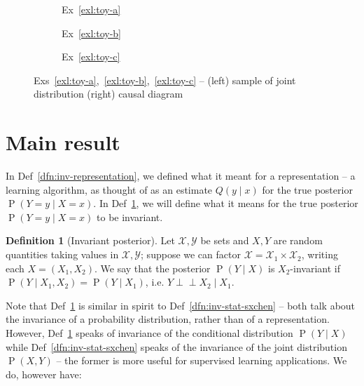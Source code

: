 \documentclass[12pt]{article}
\newcommand{\ci}{\perp\!\!\!\perp}
\newcommand{\Prob}[1]{\operatorname{P}\left(#1\right)}
\theoremstyle{definition}
\newtheorem{dfn}[thm]{Definition}
\numberwithin{equation}{section}
\numberwithin{figure}{section}
\numberwithin{table}{section}
\begin{document}
\begin{figure}

\begin{subfigure}{\textwidth}
    \centering
    
    \caption{Ex~\ref{exl:toy-a}}
    \label{fig:toy-a}
\end{subfigure}

\bigskip

\begin{subfigure}{\textwidth}
    \centering
    
    \caption{Ex~\ref{exl:toy-b}}
    \label{fig:toy-b}
\end{subfigure}

\bigskip

\begin{subfigure}{\textwidth}
    \centering
    
    \caption{Ex~\ref{exl:toy-c}}
    \label{fig:toy-c}
\end{subfigure}

\caption{Exs~\ref{exl:toy-a},~\ref{exl:toy-b},~\ref{exl:toy-c} -- (left) sample of joint distribution (right) causal diagram}

\label{fig:toy}

\end{figure}

\pagebreak
\section{Main result}
\label{sec:main}

In Def~\ref{dfn:inv-representation}, we defined what it meant for a representation -- a learning algorithm, as thought of as an estimate $Q(y\mid x)$ for the true posterior $\Prob{Y=y\mid X=x}$. In Def~\ref{dfn:inv-posterior}, we will define what it means for the true posterior $\Prob{Y=y\mid X=x}$ to be invariant.

\begin{dfn}[Invariant posterior]
    \label{dfn:inv-posterior}
    Let $\mathcal{X},\mathcal{Y}$ be sets and $X,Y$ are random quantities taking values in $\mathcal{X},\mathcal{Y}$; suppose we can factor $\mathcal{X}=\mathcal{X}_1\times\mathcal{X}_2$, writing each $X=(X_1,X_2)$. We say that the posterior $\Prob{Y\mid X}$ is $X_2$-invariant if $\Prob{Y\mid X_1, X_2}=\Prob{Y\mid X_1}$, i.e. $Y\ci X_2\mid X_1$. 
\end{dfn}

Note that Def~\ref{dfn:inv-posterior} is similar in spirit to Def~\ref{dfn:inv-stat-sxchen} -- both talk about the invariance of a probability distribution, rather than of a representation. However, Def~\ref{dfn:inv-posterior} speaks of invariance of the conditional distribution $\Prob{Y\mid X}$ while Def~\ref{dfn:inv-stat-sxchen} speaks of the invariance of the joint distribution $\Prob{X, Y}$ -- the former is more useful for supervised learning applications. We do, however have:
\end{document}
